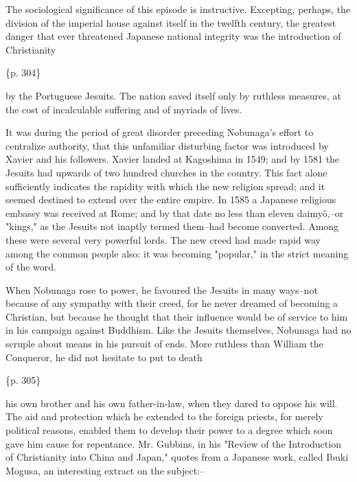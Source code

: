 The sociological significance of this episode is instructive. Excepting, perhaps, the division of the imperial house against itself in the twelfth century, the greatest danger that ever threatened Japanese national integrity was the introduction of Christianity

\{p. 304\}

by the Portuguese Jesuits. The nation saved itself only by ruthless measures, at the cost of incalculable suffering and of myriads of lives.

It was during the period of great disorder preceding Nobunaga's effort to centralize authority, that this unfamiliar disturbing factor was introduced by Xavier and his followers. Xavier landed at Kagoshima in 1549; and by 1581 the Jesuits had upwards of two hundred churches in the country. This fact alone sufficiently indicates the rapidity with which the new religion spread; and it seemed destined to extend over the entire empire. In 1585 a Japanese religious embassy was received at Rome; and by that date no less than eleven daimyô,--or "kings," as the Jesuits not inaptly termed them--had become converted. Among these were several very powerful lords. The new creed had made rapid way among the common people also: it was becoming "popular," in the strict meaning of the word.

When Nobunaga rose to power, he favoured the Jesuits in many ways--not because of any sympathy with their creed, for he never dreamed of becoming a Christian, but because he thought that their influence would be of service to him in his campaign against Buddhism. Like the Jesuits themselves, Nobunaga had no scruple about means in his pursuit of ends. More ruthless than William the Conqueror, he did not hesitate to put to death

\{p. 305\}

his own brother and his own father-in-law, when they dared to oppose his will. The aid and protection which he extended to the foreign priests, for merely political reasons, enabled them to develop their power to a degree which soon gave him cause for repentance. Mr. Gubbins, in his "Review of the Introduction of Christianity into China and Japan," quotes from a Japanese work, called Ibuki Mogusa, an interesting extract on the subject:--

